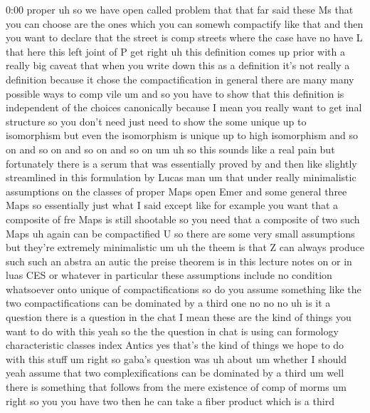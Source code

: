 \begin{unfinished}{0:00}
proper  uh  so  we  have  open  called
problem  that  that
far
said  these  Ms  that  you  can  choose  are
the  ones  which  you  can  somewh  compactify
like
that  and  then  you  want  to  declare  that
the  street
is  comp
streets  where  the  case  have  no  have  L
that  here  this  left  joint  of  P  get
right  uh  this  definition  comes  up  prior
with  a  really  big  caveat  that  when  you
write  down  this  as  a  definition  it's  not
really  a  definition  because  it  chose  the
compactification  in  general  there  are
many  many  possible  ways  to  comp
vile  um  and  so  you  have  to  show  that
this  definition  is  independent  of  the
choices  canonically  because  I  mean  you
really  want  to  get  inal  structure
so  you  don't  need  just  need  to  show  the
some  unique  up  to  isomorphism  but  even
the  isomorphism  is  unique  up  to  high
isomorphism  and  so  on  and  so  on  and  so
on  and  so  on  um  uh  so  this  sounds  like  a
real  pain  but
fortunately  there  is  a  serum  that  was
essentially  proved  by
and  then  like  slightly  streamlined  in
this  formulation  by  Lucas  man
um  that  under  really  minimalistic
assumptions  on  the  classes
of  proper  Maps
open
Emer  and  some  general  three  Maps  so
essentially  just  what  I  said
except  like  for  example  you  want  that  a
composite  of  fre  Maps  is  still  shootable
so  you  need  that  a  composite  of  two  such
Maps  uh  again  can  be  compactified
U  so  there  are  some  very  small
assumptions  but  they're  extremely
minimalistic
um  uh
the  theem  is  that  Z  can  always  produce
such  such  an  abstra  an
autic  the  preise  theorem  is
in  this  lecture  notes  on  or  in  luas  CES
or
whatever  in  particular  these  assumptions
include  no  condition  whatsoever  onto
unique  of
compactifications  so  do  you  assume
something  like  the  two  compactifications
can  be  dominated  by  a  third  one  no  no  no
uh  is  it  a  question  there  is  a  question
in  the
chat  I  mean  these  are  the  kind  of  things
you  want  to  do  with  this  yeah  so  the  the
question  in  chat  is  using  can  formology
characteristic  classes  index
Antics  yes  that's  the  kind  of  things  we
hope  to  do  with  this
stuff
um  right  so  gaba's  question  was  uh  about
um  whether  I
should  yeah  assume  that  two
complexifications  can  be  dominated  by  a
third
um  well  there  is  something  that  follows
from  the  mere  existence  of  comp  of  morms
um  right  so  you  you  have  two  then  he  can
take  a  fiber  product  which  is  a  third

\end{unfinished}
